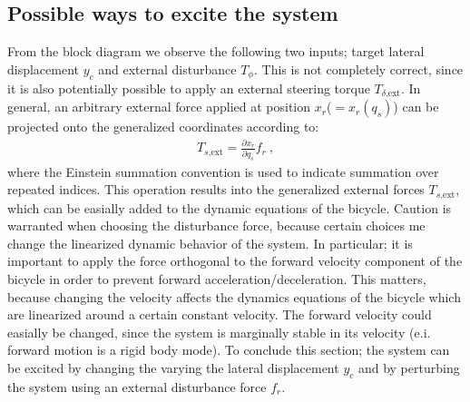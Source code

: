 \subsection{Possible ways to excite the system}
From the block diagram we observe the following two inputs; target lateral displacement $y_c$ and external disturbance $T_\phi$.  This is not completely correct, since it is also potentially possible to apply an external steering torque $T_{\delta\textrm{,ext}}$.  In general, an arbitrary external force applied at position $x_r$($= x_r(q_s)$) can be projected onto the generalized coordinates according to: 
\begin{align}
		T_{s\textrm{,ext}}  = \frac{\partial x_r}{\partial q_s} f_r \ ,
\end{align}  
where the Einstein summation convention is used to indicate summation over repeated indices. This operation results into the generalized external forces $T_{s\textrm{,ext}}$, which can be easially added to the dynamic equations of the bicycle.
		Caution is warranted when choosing the disturbance force, because certain choices me change the linearized dynamic behavior of the system.  In particular; it is important to apply the force orthogonal to the forward velocity component of the bicycle in order to prevent forward acceleration/deceleration. This matters, because changing the velocity affects the dynamics equations of the bicycle which are linearized around a certain constant velocity. The forward velocity could easially be changed, since the system is marginally stable in its velocity (e.i. forward motion is a rigid body mode).
		To conclude this section; the system can be excited by changing the varying the lateral displacement $y_c$ and by perturbing the system using an external disturbance force $f_r$.
